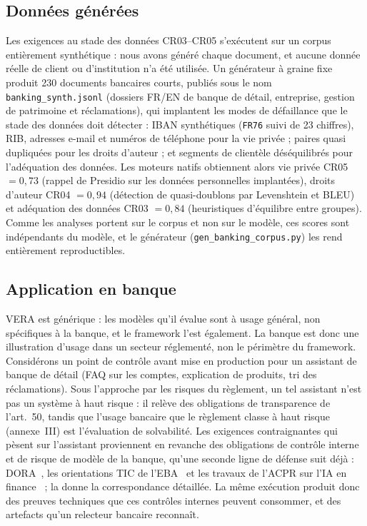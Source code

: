 \documentclass[10pt,conference]{IEEEtran}
\begin{document}
\subsection{Données générées}
\label{sec:generated}
Les exigences au stade des données CR03--CR05 s'exécutent sur un corpus entièrement synthétique : nous avons généré chaque document, et aucune donnée réelle de client ou d'institution n'a été utilisée.
Un générateur à graine fixe produit 230 documents bancaires courts, publiés sous le nom \texttt{banking\_synth.jsonl} (dossiers FR/EN de banque de détail, entreprise, gestion de patrimoine et réclamations), qui implantent les modes de défaillance que le stade des données doit détecter : IBAN synthétiques (\texttt{FR76} suivi de 23 chiffres), RIB, adresses e-mail et numéros de téléphone pour la vie privée ; paires quasi dupliquées pour les droits d'auteur ; et segments de clientèle déséquilibrés pour l'adéquation des données.
Les moteurs natifs obtiennent alors vie privée CR05 $=0{,}73$ (rappel de Presidio sur les données personnelles implantées), droits d'auteur CR04 $=0{,}94$ (détection de quasi-doublons par Levenshtein et BLEU) et adéquation des données CR03 $=0{,}84$ (heuristiques d'équilibre entre groupes).
Comme les analyses portent sur le corpus et non sur le modèle, ces scores sont indépendants du modèle, et le générateur (\texttt{gen\_banking\_corpus.py}) les rend entièrement reproductibles.

\subsection{Application en banque}
VERA est générique : les modèles qu'il évalue sont à usage général, non spécifiques à la banque, et le framework l'est également.
La banque est donc une illustration d'usage dans un secteur réglementé, non le périmètre du framework.
Considérons un point de contrôle avant mise en production pour un assistant de banque de détail (FAQ sur les comptes, explication de produits, tri des réclamations).
Sous l'approche par les risques du règlement, un tel assistant n'est pas un système à haut risque : il relève des obligations de transparence de l'art.~50, tandis que l'usage bancaire que le règlement classe à haut risque (annexe~III) est l'évaluation de solvabilité.
Les exigences contraignantes qui pèsent sur l'assistant proviennent en revanche des obligations de contrôle interne et de risque de modèle de la banque, qu'une seconde ligne de défense suit déjà : DORA~\cite{dora2022}, les orientations TIC de l'EBA~\cite{eba2021ictrisk} et les travaux de l'ACPR sur l'IA en finance~\cite{acpr2020ai} ; la  donne la correspondance détaillée.
La même exécution produit donc des preuves techniques que ces contrôles internes peuvent consommer, et des artefacts qu'un relecteur bancaire reconnaît.
\end{document}
